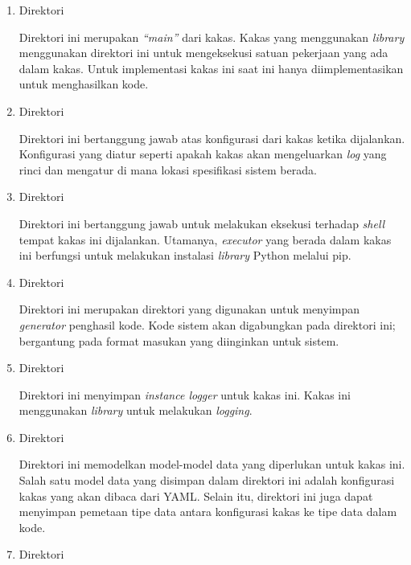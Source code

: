 \begin{enumerate}
    \item Direktori 

    Direktori ini merupakan \textit{``main''} dari kakas.
    Kakas yang menggunakan \textit{library}  menggunakan direktori ini untuk mengeksekusi satuan pekerjaan yang ada dalam kakas.
    Untuk implementasi kakas ini saat ini hanya diimplementasikan untuk menghasilkan kode.

    \item Direktori 
    
    Direktori ini bertanggung jawab atas konfigurasi dari kakas ketika dijalankan.
    Konfigurasi yang diatur seperti apakah kakas akan mengeluarkan \textit{log} yang rinci dan mengatur di mana lokasi spesifikasi sistem berada.

    \item Direktori 
    
    Direktori ini bertanggung jawab untuk melakukan eksekusi terhadap \textit{shell} tempat kakas ini dijalankan.
    Utamanya, \textit{executor} yang berada dalam kakas ini berfungsi untuk melakukan instalasi \textit{library} Python melalui pip.

    \item Direktori 
    
    Direktori ini merupakan direktori yang digunakan untuk menyimpan \textit{generator} penghasil kode.
    Kode sistem akan digabungkan pada direktori ini; bergantung pada format masukan yang diinginkan untuk sistem.

    \item Direktori 
    
    Direktori ini menyimpan \textit{instance logger} untuk kakas ini.
    Kakas ini menggunakan \textit{library}  untuk melakukan \textit{logging}.

    \item Direktori 
    
    Direktori ini memodelkan model-model data yang diperlukan untuk kakas ini.
    Salah satu model data yang disimpan dalam direktori ini adalah konfigurasi kakas yang akan dibaca dari YAML.\@
    Selain itu, direktori ini juga dapat menyimpan pemetaan tipe data antara konfigurasi kakas ke tipe data dalam kode.

    \item Direktori 
    

\end{enumerate}
